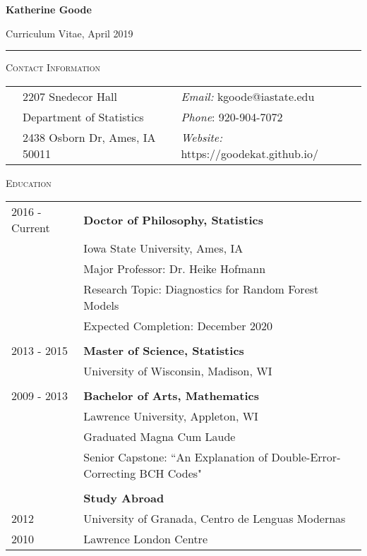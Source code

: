 \documentclass[11pt, oneside]{article}
\begin{document}
\begin{LARGE} \noindent\textbf{Katherine Goode} \end{LARGE} \hfill Curriculum Vitae, April 2019\\
\rule{\textwidth}{1pt}

\vspace{0.25cm}

\noindent \textsc{Contact Information} \hrulefill
\begin{longtable}{p{2.5cm}p{7cm}p{7cm}}
& 2207 Snedecor Hall & \emph{Email:} kgoode@iastate.edu\\
& Department of Statistics & \emph{Phone}: 920-904-7072\\
& 2438 Osborn Dr, Ames, IA 50011 & \emph{Website:} https://goodekat.github.io/
\end{longtable}

\noindent \textsc{Education} \hrulefill
\begin{longtable}{p{2.5cm}p{14cm}}
\hfill{2016 - Current} & \textbf{Doctor of Philosophy, Statistics}\\
& Iowa State University, Ames, IA\\
& Major Professor: Dr. Heike Hofmann\\
& Research Topic: Diagnostics for Random Forest Models\\
& Expected Completion: December 2020\\
\\
\hfill{2013 - 2015} & \textbf{Master of Science, Statistics}\\
& University of Wisconsin, Madison, WI\\
\\
\hfill{2009 - 2013} & \textbf{Bachelor of Arts, Mathematics}\\
& Lawrence University, Appleton, WI\\
& Graduated Magna Cum Laude\\
& Senior Capstone: ``An Explanation of Double-Error-Correcting BCH Codes"\\
\\
& \textbf{Study Abroad}\\
\hfill{2012} & \indent University of Granada, Centro de Lenguas Modernas\\
\hfill{2010} & \indent Lawrence London Centre
\end{longtable}
\end{document}
